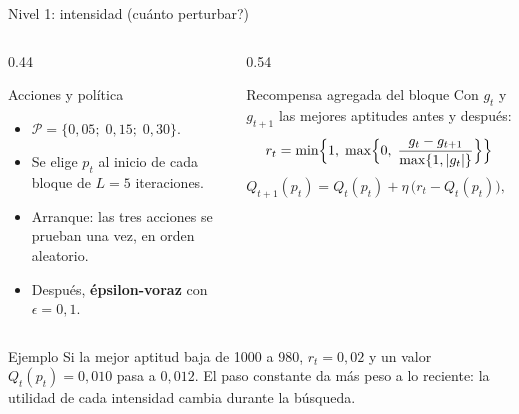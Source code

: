 \documentclass[aspectratio=169,11pt]{beamer}
\newcommand{\dc}{{,}}%
\begin{document}
\begin{frame}{Nivel 1: intensidad (\textquestiondown{}cuánto perturbar?)}
  \begin{columns}[t]
    \begin{column}{0.44\textwidth}
      \begin{block}{Acciones y política}
        \small
        \begin{itemize}
          \item $\mathcal{P}=\{0\dc05;\;0\dc15;\;0\dc30\}$.
          \item Se elige $p_t$ al inicio de cada bloque de $L=5$ iteraciones.
          \item Arranque: las tres acciones se prueban una vez, en orden aleatorio.
          \item Después, \textbf{épsilon-voraz} con $\epsilon=0\dc1$.
        \end{itemize}
      \end{block}
    \end{column}

    \begin{column}{0.54\textwidth}
      \begin{block}{Recompensa agregada del bloque}
        \small
        Con $g_t$ y $g_{t+1}$ las mejores aptitudes antes y después:
        \begin{equation*}
          r_t = \min\Bigl\{1,\; \max\Bigl\{0,\; \frac{g_t-g_{t+1}}{\max\{1,|g_t|\}}\Bigr\}\Bigr\}
        \end{equation*}
        \begin{equation*}
          Q_{t+1}(p_t) = Q_t(p_t) + \eta\,\bigl(r_t - Q_t(p_t)\bigr), \quad \eta=0\dc2
        \end{equation*}
      \end{block}
    \end{column}
  \end{columns}

  \vspace{0.15cm}
  \begin{exampleblock}{Ejemplo}
    \small
    Si la mejor aptitud baja de 1000 a 980, $r_t=0\dc02$ y un valor $Q_t(p_t)=0\dc010$ pasa a $0\dc012$. El paso constante da más peso a lo reciente: la utilidad de cada intensidad cambia durante la búsqueda.
  \end{exampleblock}
\end{frame}
\end{document}
